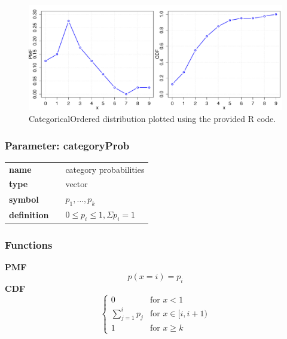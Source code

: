 \begin{figure}[ht!]
\centering
  \includegraphics[width=140mm]{pics/CategoricalOrdered.pdf}
 \caption{CategoricalOrdered distribution plotted using the provided R code.}
 \label{fig:CategoricalOrdered}
\end{figure}

\subsubsection*{Parameter: categoryProb}

\noindent\begin{tabular}{p{2cm}cl}
\textbf{name} & & category probabilities \\
\textbf{type} & & vector \\
\textbf{symbol} & & $p_1, \ldots, p_k$  \\
\textbf{definition} & & $0 \leq p_i \leq 1, \Sigma p_i = 1$
\end{tabular}
\subsubsection*{Functions}

\smallskip \noindent \hspace{.2cm} \textbf{PMF} 
\begin{equation*}p(x=i)=p_i\end{equation*}
\smallskip \noindent \hspace{.2cm} \textbf{CDF} 
\begin{equation*}\begin{cases}
    0 & \text{for }x<1 \\
    \sum_{j=1}^i p_j & \text{for }x \in [i,i+1) \\
    1 & \text{for }x \geq k
    \end{cases}\end{equation*}
\smallskip

